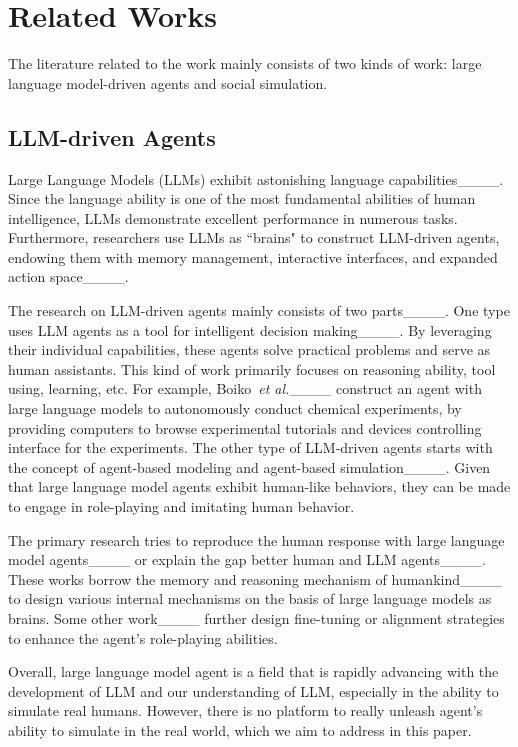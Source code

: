 \section{Related Works}
The literature related to the work mainly consists of two kinds of work: large language model-driven agents and social simulation.

\subsection{LLM-driven Agents}

Large Language Models (LLMs) exhibit astonishing language capabilities____. Since the language ability is one of the most fundamental abilities of human intelligence, LLMs demonstrate excellent performance in numerous tasks. Furthermore, researchers use LLMs as ``brains" to construct LLM-driven agents, endowing them with memory management, interactive interfaces, and expanded action space____.

The research on LLM-driven agents mainly consists of two parts____. One type uses LLM agents as a tool for intelligent decision making____. By leveraging their individual capabilities, these agents solve practical problems and serve as human assistants. This kind of work primarily focuses on reasoning ability, tool using, learning, etc.
For example, Boiko~\textit{et al.}____ construct an agent with large language models to autonomously conduct chemical experiments, by providing computers to browse experimental tutorials and devices controlling interface for the experiments.
The other type of LLM-driven agents starts with the concept of agent-based modeling and agent-based simulation____. Given that large language model agents exhibit human-like behaviors, they can be made to engage in role-playing and imitating human behavior. 

The primary research tries to reproduce the human response with large language model agents____ or explain the gap better human and LLM agents____.
These works borrow the memory and reasoning mechanism of humankind____ to design various internal mechanisms on the basis of large language models as brains.
Some other work____ further design fine-tuning or alignment strategies to enhance the agent's role-playing abilities.

Overall, large language model agent is a field that is rapidly advancing with the development of LLM and our understanding of LLM, especially in the ability to simulate real humans. However, there is no platform to really unleash agent's ability to simulate in the real world, which we aim to address in this paper.


